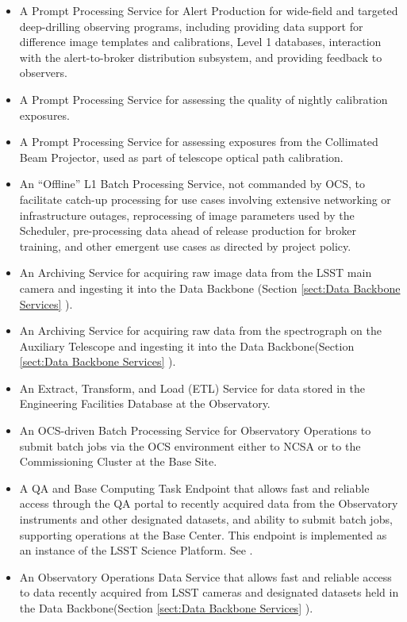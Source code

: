 \begin{itemize}
\item  A Prompt Processing Service for Alert Production for wide-field and
targeted deep-drilling observing programs, including providing data support for
difference image templates and calibrations, Level 1 databases, interaction with
the alert-to-broker distribution subsystem, and providing feedback to observers.
\item  A Prompt Processing Service for assessing the quality of nightly
calibration exposures.
\item  A Prompt Processing Service for assessing exposures from the Collimated
Beam Projector, used as part of telescope optical path calibration.
\item  An “Offline” L1 Batch Processing Service, not commanded by OCS, to
facilitate catch-up processing for use cases involving extensive networking or
infrastructure outages, reprocessing of image parameters used by the Scheduler,
pre-processing data ahead of release production for broker training, and other
emergent use cases as directed by project policy.
\item  An Archiving Service for acquiring raw image data from the LSST main
camera and ingesting it into the Data Backbone (Section \ref{sect:Data Backbone Services} ).
\item  An Archiving Service for acquiring raw data from the spectrograph on the
Auxiliary Telescope and ingesting it into the Data Backbone(Section \ref{sect:Data Backbone Services} ).
\item  An Extract, Transform, and Load (ETL) Service for data stored in the
Engineering Facilities Database at the Observatory.
\item  An OCS-driven Batch Processing Service for Observatory Operations to
submit batch jobs via the OCS environment either to NCSA or to the Commissioning
Cluster at the Base Site.
\item  A QA and Base Computing Task Endpoint that allows fast and reliable access
through the QA portal to recently acquired data from the Observatory instruments
and other designated datasets, and ability to submit batch jobs, supporting
operations at the Base Center.  This endpoint is implemented as an instance of
the LSST Science Platform. See .
\item  An Observatory Operations Data Service that allows fast and reliable
access to data recently acquired from LSST cameras and designated datasets held
in the Data Backbone(Section \ref{sect:Data Backbone Services} ).
\end{itemize}

